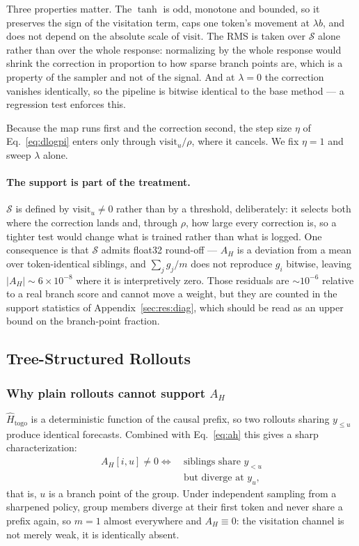 \documentclass[11pt]{article}
\newcommand{\AH}{A_{H}}
\begin{document}
Three properties matter. The $\tanh$ is odd, monotone and bounded, so it preserves
the sign of the visitation term, caps one token's movement at $\lambda b$, and does
not depend on the absolute scale of $\mathrm{visit}$. The RMS is taken over
$\mathcal{S}$ alone rather than over the whole response: normalizing by the whole
response would shrink the correction in proportion to how sparse branch points are,
which is a property of the sampler and not of the signal. And at $\lambda = 0$ the
correction vanishes identically, so the pipeline is bitwise identical to the base
method --- a regression test enforces this.

Because the map runs first and the correction second, the step size $\eta$ of
Eq.~\eqref{eq:dlogpi} enters only through $\mathrm{visit}_u / \rho$, where it
cancels. We fix $\eta = 1$ and sweep $\lambda$ alone.

\paragraph{The support is part of the treatment.}
$\mathcal{S}$ is defined by $\mathrm{visit}_u \neq 0$ rather than by a threshold,
deliberately: it selects both where the correction lands and, through $\rho$, how
large every correction is, so a tighter test would change what is trained rather than
what is logged. One consequence is that $\mathcal{S}$ admits float32 round-off ---
$\AH$ is a deviation from a mean over token-identical siblings, and
$\sum_j g_j / m$ does not reproduce $g_i$ bitwise, leaving $|\AH| \sim 6\times10^{-8}$
where it is interpretively zero. Those residuals are $\sim\!10^{-6}$ relative to a
real branch score and cannot move a weight, but they are counted in the support
statistics of Appendix~\ref{sec:res:diag}, which should be read as an upper bound on
the branch-point fraction.

\subsection{Tree-Structured Rollouts}
\label{sec:tree}

\subsubsection{Why plain rollouts cannot support $\AH$}

$\hat{H}_{\mathrm{togo}}$ is a deterministic function of the causal prefix, so two
rollouts sharing $y_{\le u}$ produce identical forecasts. Combined with
Eq.~\eqref{eq:ah} this gives a sharp characterization:
%
\begin{equation}
\begin{split}
\AH[i, u] \neq 0 \iff\ &\text{siblings share } y_{<u}\\
&\text{but diverge at } y_u,
\end{split}
\label{eq:branchonly-app}
\end{equation}
%
that is, $u$ is a branch point of the group. Under independent sampling from a
sharpened policy, group members diverge at their first token and never share a
prefix again, so $m = 1$ almost everywhere and $\AH \equiv 0$: the visitation
channel is not merely weak, it is identically absent.
\end{document}
